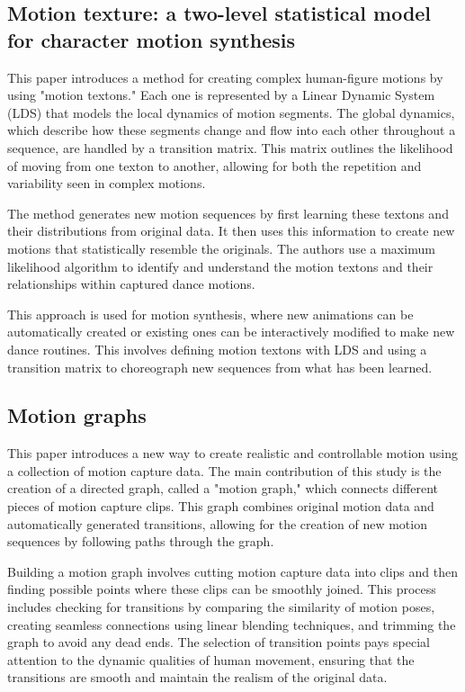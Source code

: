 \documentclass[a4paper, 12pt]{report}
\begin{document}
\subsection{Motion texture: a two-level statistical model for character motion synthesis}
This paper \cite{li_motion_2002} introduces a method for creating complex human-figure motions by using "motion textons." Each one is represented by a Linear Dynamic System (LDS) that models the local dynamics of motion segments. The global dynamics, which describe how these segments change and flow into each other throughout a sequence, are handled by a transition matrix. This matrix outlines the likelihood of moving from one texton to another, allowing for both the repetition and variability seen in complex motions.

The method generates new motion sequences by first learning these textons and their distributions from original data. It then uses this information to create new motions that statistically resemble the originals. The authors use a maximum likelihood algorithm to identify and understand the motion textons and their relationships within captured dance motions. 

This approach is used for motion synthesis, where new animations can be automatically created or existing ones can be interactively modified to make new dance routines. This involves defining motion textons with LDS and using a transition matrix to choreograph new sequences from what has been learned.

\subsection{Motion graphs}
This paper \cite{kovar_motion_2002} introduces a new way to create realistic and controllable motion using a collection of motion capture data. The main contribution of this study is the creation of a directed graph, called a "motion graph," which connects different pieces of motion capture clips. This graph combines original motion data and automatically generated transitions, allowing for the creation of new motion sequences by following paths through the graph.

Building a motion graph involves cutting motion capture data into clips and then finding possible points where these clips can be smoothly joined. This process includes checking for transitions by comparing the similarity of motion poses, creating seamless connections using linear blending techniques, and trimming the graph to avoid any dead ends. The selection of transition points pays special attention to the dynamic qualities of human movement, ensuring that the transitions are smooth and maintain the realism of the original data.
\end{document}
